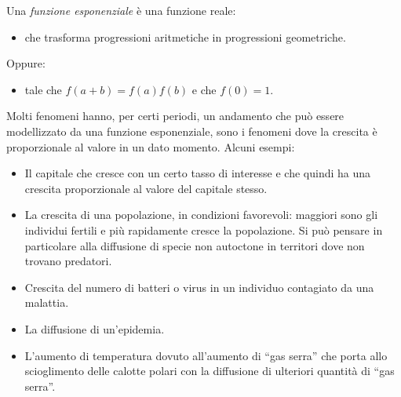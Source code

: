 
\begin{definizione}
Una \emph{funzione esponenziale} è una funzione reale:
\begin{itemize} [nosep]
\item che trasforma progressioni aritmetiche in progressioni geometriche.
\end{itemize}
Oppure:
\begin{itemize} [nosep]
\item tale che \(f(a+b)=f(a)f(b)\) e che \(f(0)=1\).
\end{itemize}
\end{definizione}

Molti fenomeni hanno, per certi periodi, un andamento che può essere 
modellizzato da una funzione esponenziale, sono i fenomeni dove la crescita 
è proporzionale al valore in un dato momento. Alcuni esempi:

\noindent \begin{minipage}[]{.54\textwidth}
\begin{itemize}
\small 
 \item 
Il capitale che cresce con un certo tasso di interesse e che quindi ha una 
crescita proporzionale al valore del capitale stesso.
 \item 
La crescita di una popolazione, in condizioni favorevoli: maggiori sono gli 
individui fertili e più rapidamente cresce
la popolazione. Si può pensare in particolare alla diffusione di specie non 
autoctone in 
territori dove non trovano predatori.
 \item 
Crescita del numero di batteri o virus in un 
individuo contagiato da una malattia.
 \item 
La diffusione di un'epidemia.
 \item 
L'aumento di temperatura dovuto all'aumento di ``gas serra'' che porta allo 
scioglimento delle calotte polari con la diffusione di ulteriori quantità 
di 
``gas serra''.
\end{itemize}

\end{minipage} \quad
\begin{minipage}[]{.44\textwidth}
\begin{center}
\begin{inaccessibleblock}
\graficoesponenziale
\end{inaccessibleblock}
\end{center}
\end{minipage}

